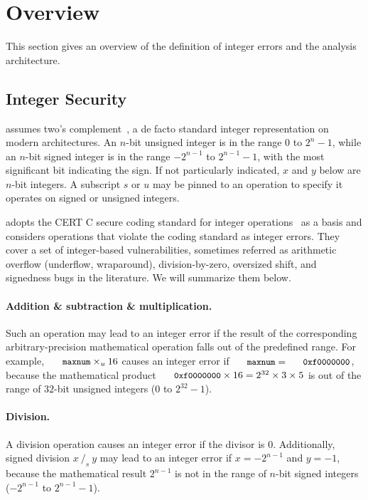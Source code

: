\section{Overview}
\label{s:oview}

This section gives an overview of the definition of integer errors
and the analysis architecture.

\subsection{Integer Security}
\label{s:goal}

\sys assumes two's complement~\cite[\chapterautorefname~4.2.1]{intel:vol1},
a de facto standard integer representation on modern architectures.
An $n$-bit unsigned integer is in the range $0$ to $2^n-1$, while
an $n$-bit signed integer is in the range $-2^{n-1}$ to $2^{n-1}-1$,
with the most significant bit indicating the sign.  If not particularly
indicated, $x$ and $y$ below are $n$-bit integers.  A subscript $s$
or $u$ may be pinned to an operation to specify it operates on
signed or unsigned integers.

\sys adopts the CERT C secure coding standard for integer
operations~\cite[\chapterautorefname~5]{seacord:secure-c} as a basis
and considers operations that violate the coding standard as integer
errors.  They cover a set of integer-based vulnerabilities, sometimes
referred as arithmetic overflow (underflow, wraparound), division-by-zero,
oversized shift, and signedness bugs in the literature.  We will
summarize them below.

\paragraph{Addition \& subtraction \& multiplication.}
Such an operation may lead to an integer error if the result of the
corresponding arbitrary-precision mathematical operation falls out
of the predefined range.  For example, $\cc{maxnum}\times_u 16$
causes an integer error if $\cc{maxnum} = \cc{0xf0000000}$, because
the mathematical product $\cc{0xf0000000} \times 16 = 2^{32}\times
3\times 5$ is out of the range of $32$-bit unsigned integers ($0$
to $2^{32} - 1$).

\paragraph{Division.}
A division operation causes an integer error if the divisor is 0.
Additionally, signed division $x\ /_s\ y$ may lead to an integer
error if $x = -2^{n-1}$ and $y = -1$, because the mathematical
result $2^{n-1}$ is not in the range of $n$-bit signed integers
($-2^{n-1}$ to $2^{n-1}-1$).

